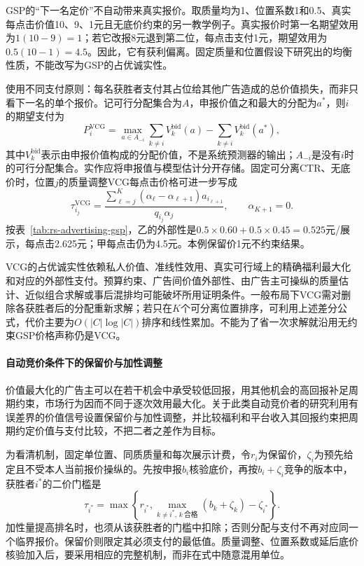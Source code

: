 GSP的“下一名定价”不自动带来真实报价。取质量均为1、位置系数1和0.5、真实每点击价值10、9、1元且无底价约束的另一教学例子。真实报价时第一名期望效用为$1(10-9)=1$；若它改报8元退到第二位，每点击支付1元，期望效用为$0.5(10-1)=4.5$。因此，它有获利偏离。固定质量和位置假设下研究出的均衡性质，不能改写为GSP的占优诚实性。

使用不同支付原则：每名获胜者支付其占位给其他广告造成的总价值损失，而非只看下一名的单个报价。记可行分配集合为$A$，申报价值之和最大的分配为$a^*$，则$i$的期望支付为
\begin{equation}
  P_i^{\mathrm{VCG}}
   =\max_{a\in A_{-i}}\sum_{k\ne i}V_k^{\mathrm{bid}}(a)
      -\sum_{k\ne i}V_k^{\mathrm{bid}}(a^*),
  \label{eq:rs-advertising-vcg}
\end{equation}
其中$V_k^{\mathrm{bid}}$表示由申报价值构成的分配价值，不是系统预测器的输出；$A_{-i}$是没有$i$时的可行分配集合。实作应将申报值与模型估计分开存储。固定可分离CTR、无底价时，位置$j$的质量调整VCG每点击价格可进一步写成
\[
  \tau_{i_j}^{\mathrm{VCG}}
   =\frac{\sum_{\ell=j}^{K}
       (\alpha_\ell-\alpha_{\ell+1})a_{i_{\ell+1}}}
          {q_{i_j}\alpha_j},
  \qquad \alpha_{K+1}=0.
\]
按表~\ref{tab:rs-advertising-gsp}，乙的外部性是$0.5\times0.60+0.5\times0.45=0.525$元/展示，每点击2.625元；甲每点击仍为4.5元。本例保留价1元不约束结果。

VCG的占优诚实性依赖私人价值、准线性效用、真实可行域上的精确福利最大化和对应的外部性支付。预算约束、广告间价值外部性、由广告主可操纵的质量估计、近似组合求解或事后混排均可能破坏所用证明条件。一般布局下VCG需对删除各获胜者后的分配重新求解；若只在$K$个可分离位置排序，可利用上述差分公式，代价主要为$O(|C|\log|C|)$排序和线性累加。不能为了省一次求解就沿用无约束GSP价格声称仍是VCG。

\paragraph{自动竞价条件下的保留价与加性调整}
\label{sec:rs-advertising-reserves}

价值最大化的广告主可以在若干机会中承受较低回报，用其他机会的高回报补足周期约束，市场行为因而不同于逐次效用最大化。关于此类自动竞价者的研究利用有误差界的价值信号设置保留价与加性调整，并比较福利和平台收入其回报约束把周期约定价值与支付比较，不把二者之差作为目标。

为看清机制，固定单位置、同质质量和每次展示计费，令$r_i$为保留价，$\zeta_i$为预先给定且不受本人当前报价操纵的。先按申报$b_i$核验底价，再按$b_i+\zeta_i$竞争的版本中，获胜者$i^*$的二价门槛是
\begin{equation}
  \tau_{i^*}
    =\max\!\left\{r_{i^*},
       \max_{k\ne i^*,\,k\ \text{合格}}(b_k+\zeta_k)
          -\zeta_{i^*}\right\}.
  \label{eq:rs-advertising-boost}
\end{equation}
加性量提高排名时，也须从该获胜者的门槛中扣除；否则分配与支付不再对应同一个临界报价。保留价则限定其必须支付的最低值。质量调整、位置系数或延后底价核验加入后，要采用相应的完整机制，而非在式中随意混用单位。

